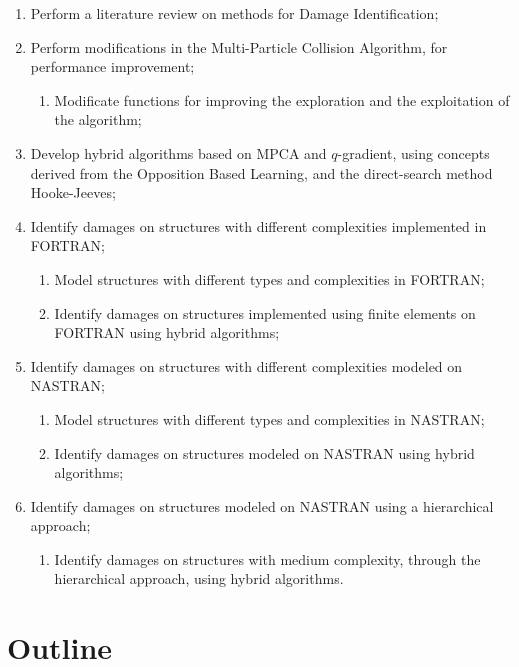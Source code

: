 \begin{enumerate}
\item Perform a literature review on methods for Damage Identification;
\item Perform modifications in the Multi-Particle Collision Algorithm, for performance improvement;
\vspace{0.5em}
\begin{enumerate}
\item Modificate functions for improving the exploration and the exploitation of the algorithm;
\end{enumerate}
\item Develop hybrid algorithms based on MPCA and $q$-gradient, using concepts derived from the Opposition Based Learning, and the direct-search method Hooke-Jeeves;
\item Identify damages on structures with different complexities implemented in FORTRAN;
\vspace{0.5em}
\begin{enumerate}
\item Model structures with different types and complexities in FORTRAN;
\item Identify damages on structures implemented using finite elements on FORTRAN using hybrid algorithms;
\end{enumerate}
\item Identify damages on structures with different complexities modeled on NASTRAN;
\vspace{0.5em}
\begin{enumerate}
\item Model structures with different types and complexities in NASTRAN;
\item Identify damages on structures modeled on NASTRAN using hybrid algorithms;
\end{enumerate}
\item Identify damages on structures modeled on NASTRAN using a hierarchical approach;
\vspace{0.5em}
\begin{enumerate}
\item Identify damages on structures with medium complexity, through the hierarchical approach, using hybrid algorithms.
\end{enumerate}
\end{enumerate}

\section{Outline}

